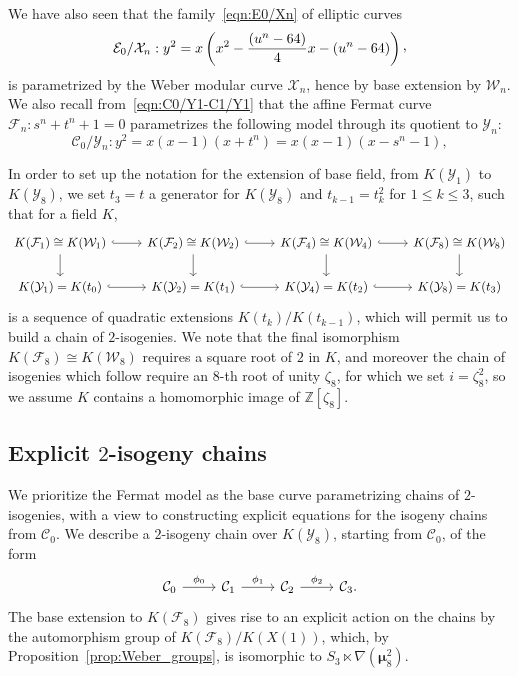 \documentclass{amsart}
\newcommand{\cC}{\mathcal{C}}
\newcommand{\cE}{\mathcal{E}}
\newcommand{\cF}{\mathcal{F}}
\newcommand{\cX}{\mathcal{X}}
\newcommand{\cY}{\mathcal{Y}}
\newcommand{\cW}{\mathcal{W}}
\newcommand{\QQ}{\mathbb{Q}}
\newcommand{\ZZ}{\mathbb{Z}}
\newcommand{\isom}{\cong}
\newcommand{\ccomma}{\raisebox{0.4ex}{,}}
\newcommand{\mmu}{\boldsymbol{\mu}}
\begin{document}
We have also seen that the family~\eqref{eqn:E0/Xn} of elliptic curves
$$
\cE_0/\cX_n: y^2 = x\left(x^2 - \frac{(u^n - 64)}{4}x - (u^n - 64)\right)\ccomma
$$
is parametrized by the Weber modular curve $\cX_n$, hence by base extension by $\cW_n$.
We also recall from~\eqref{eqn:C0/Y1-C1/Y1} that the affine Fermat curve
$\cF_n : s^n + t^n + 1 = 0$ parametrizes the following model through its quotient
to $\cY_n$:
$$
\cC_0/\cY_n:y^2 = x(x - 1)(x + t^n) = x(x - 1)(x - s^n - 1),
$$

In order to set up the notation for the extension of base field, from $K(\cY_1)$ to
$K(\cY_8)$, we set $t_3 = t$ a generator for $K(\cY_8)$ and $t_{k-1} = t_{k}^2$
for $1 \le k \le 3$, such that for a field $K$,
$$
\begin{tikzcd}
  K(\cF_1) \isom K(\cW_1) \arrow[d]\arrow[r,hook] &
  K(\cF_2) \isom K(\cW_2) \arrow[d]\arrow[r,hook] &
  K(\cF_4) \isom K(\cW_4) \arrow[d]\arrow[r,hook] &
  K(\cF_8) \isom K(\cW_8) \arrow[d] \\
  K(\cY_1) = K(t_0) \arrow[r,hook] & K(\cY_2) = K(t_1) \arrow[r,hook] & K(\cY_4) = K(t_2) \arrow[r,hook] & K(\cY_{8}) = K(t_3)
\end{tikzcd}
$$
is a sequence of quadratic extensions $K(t_k)/K(t_{k-1})$, which will permit us
to build a chain of $2$-isogenies.  We note that the final isomorphism
$K(\cF_8) \isom K(\cW_8)$ requires a square root of $2$ in $K$, and moreover
the chain of isogenies which follow require an $8$-th root of unity $\zeta_8$,
for which we set $i = \zeta_8^2$, so we assume $K$ contains a homomorphic
image of $\ZZ[\zeta_8]$.

\subsection*{Explicit $2$-isogeny chains}
We prioritize the Fermat model as the base curve parametrizing chains of $2$-isogenies,
with a view to constructing explicit equations for the isogeny chains from $\cC_0$.
We describe a $2$-isogeny chain over $K(\cY_8)$, starting from $\cC_0$, of the form
$$
\begin{tikzcd}
  \cC_0 \arrow[r,"\phi_0"] & \cC_1 \arrow[r,"\phi_1"] & \cC_2 \arrow[r,"\phi_2"] & \cC_3.
\end{tikzcd}
$$
The base extension to $K(\cF_8)$ gives rise to an explicit action on the chains
by the automorphism group of $K(\cF_8)/K(X(1))$, which,
by Proposition~\ref{prop:Weber_groups}, is isomorphic to $S_3 \ltimes \nabla(\mmu_8^2)$.
\end{document}
